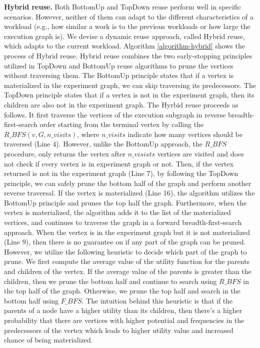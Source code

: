 \textbf{Hybrid reuse.}
Both BottomUp and TopDown reuse perform well in specific scenarios. 
However, neither of them can adapt to the different characteristics of a workload (e.g., how similar a work is to the previous workloads or how large the execution graph is).
We devise a dynamic reuse approach, called Hybrid reuse, which adapts to the current workload.
Algorithm \ref{algorithm-hybrid} shows the process of Hybrid reuse.
Hybrid reuse combines the two early-stopping principles utilized in TopDown and BottomUp reuse algorithms to prune the vertices without traversing them.
The BottomUp principle states that if a vertex is materialized in the experiment graph, we can skip traversing its predecessors.
The TopDown principle states that if a vertex is not in the experiment graph, then its children are also not in the experiment graph.
The Hyrbid reuse proceeds as follows.
It first traverse the vertices of the execution subgraph in reverse breadth-first-search order starting from the terminal vertex by calling the $R\_BFS(v, G, n\_visits)$, where $n\_visits$ indicate how many vertices should be traversed (Line 4).
However, unlike the BottomUp approach, the $R\_BFS$ procedure, only returns the vertex after $n\_visists$ vertices are visited and does not check if every vertex is in experiment graph or not.
Then, if the vertex returned is not in the experiment graph (Line 7), by following the TopDown principle, we can safely prune the bottom half of the graph and perform another reverse traversal.
If the vertex is materialized (Line 16), the algorithm utilizes the BottomUp principle and prunes the top half the graph.
Furthermore, when the vertex is materialized, the algorithm adds it to the list of the materialized vertices, and continues to traverse the graph in a forward breadth-first-search approach.
When the vertex is in the experiment graph but it is not materialized (Line 9), then there is no guarantee on if any part of the graph can be pruned.
However, we utilize the following heuristic to decide which part of the graph to prune.
We first compute the average value of the utility function for the parents and children of the vertex.
If the average value of the parents is greater than the children, then we prune the bottom half and continue to search using $R\_BFS$ in the top half of the graph.
Otherwise, we prune the top half and search in the bottom half using $F\_BFS$.
The intuition behind this heuristic is that if the parents of a node have a higher utility than its children, then there's a higher probability that there are vertices with higher potential and frequencies in the predecessors of the vertex which leads to higher utility value and increased chance of being materialized.

